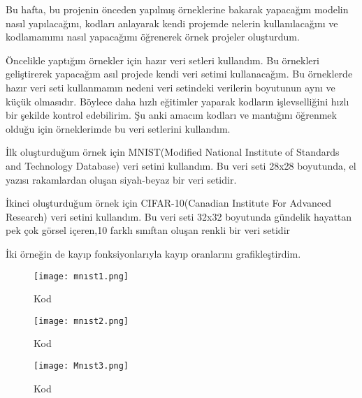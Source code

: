 \documentclass{article}
\begin{document}
\noindent Bu hafta, bu projenin önceden yapılmış örneklerine\cite{Github3} bakarak yapacağım modelin nasıl yapılacağını, kodları anlayarak kendi projemde nelerin kullanılacağını ve kodlamamımı nasıl yapacağımı öğrenerek örnek projeler oluşturdum.\vspace{0.5cm}

\noindent Öncelikle yaptığım örnekler için hazır veri setleri kullandım. Bu örnekleri geliştirerek yapacağım asıl projede kendi veri setimi kullanacağım. Bu örneklerde hazır veri seti kullanmamın nedeni veri setindeki verilerin boyutunun aynı ve küçük olmasıdır. Böylece daha hızlı eğitimler yaparak kodların işlevselliğini hızlı bir şekilde kontrol edebilirim. Şu anki amacım kodları ve mantığını öğrenmek olduğu için örneklerimde bu veri setlerini kullandım.\vspace{0.5cm}

\noindent İlk oluşturduğum örnek için MNIST(Modified National Institute of Standards and Technology Database) veri setini kullandım. Bu veri seti 28x28 boyutunda, el yazısı rakamlardan oluşan siyah-beyaz bir veri setidir.\vspace{0.5cm}

\noindent İkinci oluşturduğum örnek için CIFAR-10(Canadian Institute For Advanced Research) veri setini kullandım. Bu veri seti 32x32 boyutunda gündelik hayattan pek çok görsel içeren,10 farklı sınıftan oluşan renkli bir veri setidir\vspace{0.5cm}

\noindent İki örneğin de kayıp fonksiyonlarıyla kayıp oranlarını grafikleştirdim. \vspace{0.5cm}

\renewcommand{\figurename}{Şekil}

\begin{figure}[htbp]
     \centering
\texttt{[image: mnıst1.png]}\centering 
  \caption{Kod}
  \label{fig:resim_etiketi}
\end{figure}

\renewcommand{\figurename}{Şekil}

\begin{figure}[htbp]
     \centering
\texttt{[image: mnıst2.png]}\centering 
  \caption{Kod}
  \label{fig:resim_etiketi}
\end{figure}

\renewcommand{\figurename}{Şekil}

\begin{figure}[htbp]
     \centering
\texttt{[image: Mnıst3.png]}\centering 
  \caption{Kod}
  \label{fig:resim_etiketi}
\end{figure}
\end{document}
